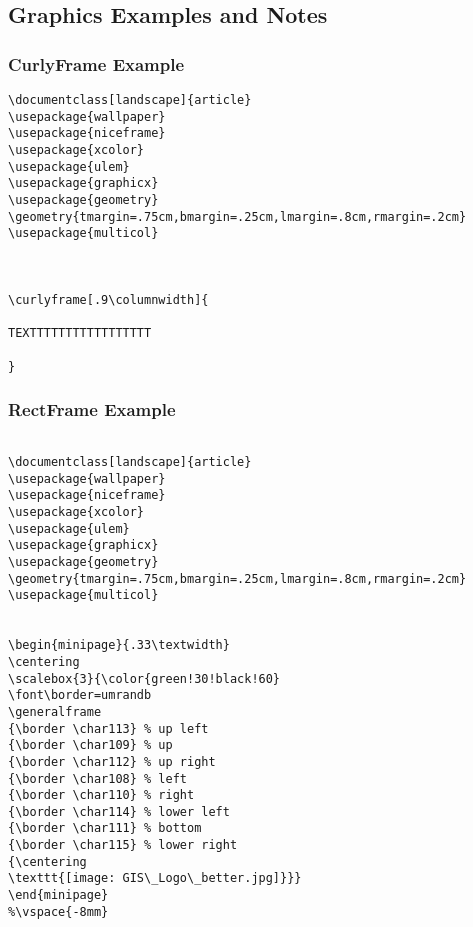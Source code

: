 %
%
%
%
% 
\subsection{Graphics Examples and Notes}
\subsubsection[Curly Frame]{\LARGE CurlyFrame Example}
\begin{verbatim}
\documentclass[landscape]{article}
\usepackage{wallpaper}
\usepackage{niceframe}
\usepackage{xcolor}
\usepackage{ulem}
\usepackage{graphicx}
\usepackage{geometry}
\geometry{tmargin=.75cm,bmargin=.25cm,lmargin=.8cm,rmargin=.2cm}
\usepackage{multicol}



\curlyframe[.9\columnwidth]{

TEXTTTTTTTTTTTTTTTTT

}

\end{verbatim}

\subsubsection[Rectangle Frame]{\LARGE RectFrame Example}

\begin{verbatim}

\documentclass[landscape]{article}
\usepackage{wallpaper}
\usepackage{niceframe}
\usepackage{xcolor}
\usepackage{ulem}
\usepackage{graphicx}
\usepackage{geometry}
\geometry{tmargin=.75cm,bmargin=.25cm,lmargin=.8cm,rmargin=.2cm}
\usepackage{multicol}


\begin{minipage}{.33\textwidth}
\centering
\scalebox{3}{\color{green!30!black!60}
\font\border=umrandb
\generalframe
{\border \char113} % up left
{\border \char109} % up
{\border \char112} % up right
{\border \char108} % left
{\border \char110} % right
{\border \char114} % lower left
{\border \char111} % bottom
{\border \char115} % lower right
{\centering
\texttt{[image: GIS\_Logo\_better.jpg]}}}
\end{minipage}
%\vspace{-8mm}


\end{verbatim}


